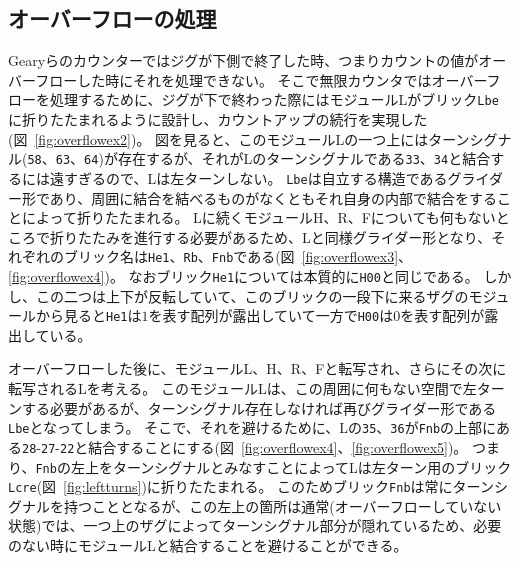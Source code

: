 \documentclass[a4,11pt]{article}
\begin{document}
\subsection{オーバーフローの処理}
Gearyらのカウンターではジグが下側で終了した時、つまりカウントの値がオーバーフローした時にそれを処理できない。
そこで無限カウンタではオーバーフローを処理するために、ジグが下で終わった際にはモジュールLがブリック\texttt{Lbe}に折りたたまれるように設計し、カウントアップの続行を実現した(図~\ref{fig:overflowex2})。
図を見ると、このモジュールLの一つ上にはターンシグナル(\texttt{58}、\texttt{63}、\texttt{64})が存在するが、それがLのターンシグナルである\texttt{33}、\texttt{34}と結合するには遠すぎるので、Lは左ターンしない。
\texttt{Lbe}は自立する構造であるグライダー形であり、周囲に結合を結べるものがなくともそれ自身の内部で結合をすることによって折りたたまれる。
Lに続くモジュールH、R、Fについても何もないところで折りたたみを進行する必要があるため、Lと同様グライダー形となり、それぞれのブリック名は\texttt{He1}、\texttt{Rb}、\texttt{Fnb}である(図~\ref{fig:overflowex3}、\ref{fig:overflowex4})。
なおブリック\texttt{He1}については本質的に\texttt{H00}と同じである。
しかし、この二つは上下が反転していて、このブリックの一段下に来るザグのモジュールから見ると\texttt{He1}は$1$を表す配列が露出していて一方で\texttt{H00}は$0$を表す配列が露出している。

オーバーフローした後に、モジュールL、H、R、Fと転写され、さらにその次に転写されるLを考える。
このモジュールLは、この周囲に何もない空間で左ターンする必要があるが、ターンシグナル存在しなければ再びグライダー形である\texttt{Lbe}となってしまう。
そこで、それを避けるために、Lの\texttt{35}、\texttt{36}が\texttt{Fnb}の上部にある\texttt{28}{-}\texttt{27}{-}\texttt{22}と結合することにする(図~\ref{fig:overflowex4}、\ref{fig:overflowex5})。
つまり、\texttt{Fnb}の左上をターンシグナルとみなすことによってLは左ターン用のブリック\texttt{Lcre}(図~\ref{fig:leftturns})に折りたたまれる。
このためブリック\texttt{Fnb}は常にターンシグナルを持つこととなるが、この左上の箇所は通常(オーバーフローしていない状態)では、一つ上のザグによってターンシグナル部分が隠れているため、必要のない時にモジュールLと結合することを避けることができる。
\end{document}
